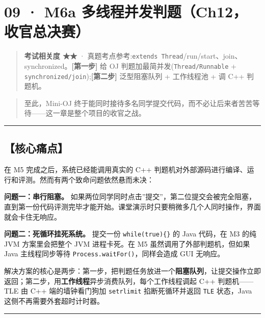 \documentclass[
  11pt,
]{ctexart}
\begin{document}
\hypertarget{m6a-ux591aux7ebfux7a0bux5e76ux53d1ux5224ux9898ch12ux6536ux5b98ux603bux51b3ux8d5b}{%
\section{09 · M6a
多线程并发判题（Ch12，收官总决赛）}\label{m6a-ux591aux7ebfux7a0bux5e76ux53d1ux5224ux9898ch12ux6536ux5b98ux603bux51b3ux8d5b}}

\begin{quote}
\textbf{考试相关度 ★★} ·
真题考点参考:\texttt{extends\ Thread}/run/start、join、synchronized。\textbf{{[}第一步{]}}
\KS 给 OJ 判题加最简并发(\texttt{Thread/Runnable} +
\texttt{synchronized/join});\textbf{{[}第二步{]}} \GC 泛型阻塞队列 +
工作线程池 + 调 C++ 判题机。
\end{quote}

\begin{quote}
至此，Mini-OJ
终于能同时接待多名同学提交代码，而不必让后来者苦苦等待------这一章是整个项目的收官之战。
\end{quote}

\begin{center}\rule{0.5\linewidth}{0.5pt}\end{center}

\hypertarget{ux6838ux5fc3ux75dbux70b9-4}{%
\subsection{【核心痛点】}\label{ux6838ux5fc3ux75dbux70b9-4}}

在 M5 完成之后，系统已经能调用真实的 C++
判题机对外部源码进行编译、运行和评测。然而有两个致命问题依然悬而未决：

\textbf{问题一：串行阻塞。}
如果两位同学同时点击''提交''，第二位提交会被完全阻塞，直到第一份代码评测完毕才能开始。课堂演示时只要稍微多几个人同时操作，界面就会卡住无响应。

\textbf{问题二：死循环挂死系统。} 提交一份 \texttt{while(true)\{\}} 的
Java 代码，在 M3 的纯 JVM 方案里会把整个 JVM 进程卡死。在 M5
虽然调用了外部判题机，但如果 Java 主线程同步等待
\texttt{Process.waitFor()}，同样会造成 GUI 无响应。

解决方案的核心是两步：第一步，把判题任务放进一个\textbf{阻塞队列}，让提交操作立即返回；第二步，用\textbf{工作线程}异步消费队列，每个工作线程调起
C++ 判题机------TLE 由 C++ 端的墙钟看门狗加 \texttt{setrlimit}
掐断死循环并返回 \texttt{TLE} 状态，Java 这侧不再需要外套超时计时器。

\begin{center}\rule{0.5\linewidth}{0.5pt}\end{center}
\end{document}
